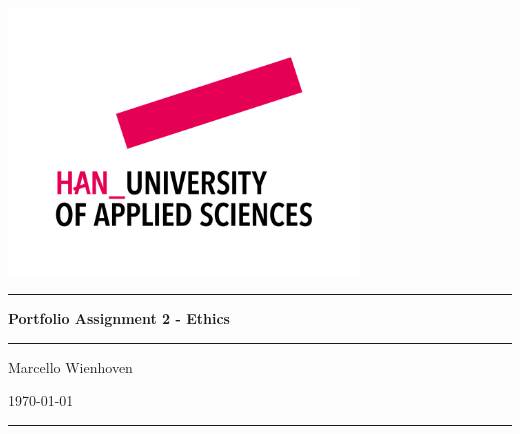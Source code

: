 \documentclass[11pt, twoside]{article}
\numberwithin{equation}{section}
\renewcommand{\baselinestretch}{1}\normalsize
\begin{document}
\thispagestyle{empty}  %
\pagestyle{fancy}      %

\renewcommand{\baselinestretch}{1}\normalsize

\fancyhf{}  %
\renewcommand{\footrulewidth}{1.1pt}  %
\renewcommand{\headrulewidth}{0pt}    %
\fancyfoot[LE]{\thepage}  %
\fancyfoot[RO]{\thepage}  %
\fancyfoot[LO]{\leftmark}   %
\fancyfoot[RE]{\leftmark}   %

\begin{titlepage}
    \centering
    \includegraphics[width=0.7\textwidth]{HAN-merkteken-descriptor.png}
    \vspace{1cm} %
    \hrule
    \vspace{0.5cm}
    {\Huge \bfseries Portfolio Assignment 2 - Ethics \par}
    \vspace{0.5cm}
    \hrule
    \vspace{0.5cm}
    {\LARGE Marcello Wienhoven \par}
    \vspace{0.5cm}
    {\LARGE \today \par}
    \vspace{0.5cm}
    \hrule
    
\end{titlepage}
\end{document}
